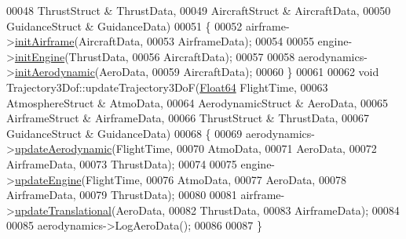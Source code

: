 \begin{DoxyCode}
00048                                         ThrustStruct & ThrustData, 
00049                                         AircraftStruct & AircraftData, 
00050                                         GuidanceStruct & GuidanceData)
00051 \{
00052     airframe->\hyperlink{group___airframe_a57b5f7a74d11723186f34fc183e1581b}{initAirframe}(AircraftData,
00053         AirframeData);
00054 
00055     engine->\hyperlink{group___engine_aee607dba02101af5b299920f89b56e79}{initEngine}(ThrustData,
00056         AircraftData);
00057 
00058     aerodynamics->\hyperlink{group___aerodynamic_aa4fee96e5b485cac47b3bc2127a6d4e2}{initAerodynamic}(AeroData,
00059         AircraftData);
00060 \}
00061 
00062 \textcolor{keywordtype}{void} Trajectory3Dof::updateTrajectory3DoF(\hyperlink{group___tools_ga3f1431cb9f76da10f59246d1d743dc2c}{Float64} FlightTime, 
00063                                           AtmosphereStruct & AtmoData, 
00064                                           AerodynamicStruct & AeroData, 
00065                                           AirframeStruct & AirframeData, 
00066                                           ThrustStruct & ThrustData, 
00067                                           GuidanceStruct & GuidanceData)
00068 \{
00069     aerodynamics->\hyperlink{group___aerodynamic_adf6047b063022ff3b689e269d2b35863}{updateAerodynamic}(FlightTime,
00070                                     AtmoData,
00071                                     AeroData,
00072                                     AirframeData,
00073                                     ThrustData);
00074 
00075     engine->\hyperlink{group___engine_a9e16100ffd33cf8ec632257795c03865}{updateEngine}(FlightTime,
00076                         AtmoData,
00077                         AeroData,
00078                         AirframeData,
00079                         ThrustData);
00080 
00081     airframe->\hyperlink{group___airframe_a29b3a2854700f77468b6a94c5b7d0372}{updateTranslational}(AeroData,
00082                                 ThrustData,
00083                                 AirframeData);
00084 
00085     aerodynamics->LogAeroData();
00086 
00087 \}
\end{DoxyCode}

